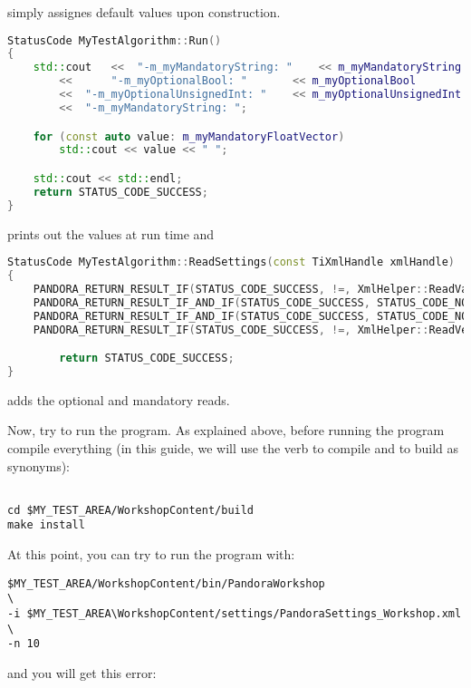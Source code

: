 simply assignes default values upon construction.

\begin{lstlisting}[language=C++, caption=Python example]
StatusCode MyTestAlgorithm::Run()
{
    std::cout	<<	"-m_myMandatoryString: " 	<< m_myMandatoryString 		<< std::endl
		<<      "-m_myOptionalBool: "	 	<< m_myOptionalBool    		<< std::endl
		<<	"-m_myOptionalUnsignedInt: "	<< m_myOptionalUnsignedInt	<< std::endl
		<<	"-m_myMandatoryString: ";	

    for (const auto value: m_myMandatoryFloatVector)
        std::cout << value << " ";    

    std::cout << std::endl;
    return STATUS_CODE_SUCCESS;
}
\end{lstlisting}

prints out the values at run time and

\begin{lstlisting}[language=C++, caption=Python example]
StatusCode MyTestAlgorithm::ReadSettings(const TiXmlHandle xmlHandle)
{
	PANDORA_RETURN_RESULT_IF(STATUS_CODE_SUCCESS, !=, XmlHelper::ReadValue(xmlHandle,"MyMandatoryString", m_myMandatoryString));
	PANDORA_RETURN_RESULT_IF_AND_IF(STATUS_CODE_SUCCESS, STATUS_CODE_NOT_FOUND, !=, XmlHelper::ReadValue(xmlHandle,"MyOptionalBool", m_myOptionalBool));
	PANDORA_RETURN_RESULT_IF_AND_IF(STATUS_CODE_SUCCESS, STATUS_CODE_NOT_FOUND, !=, XmlHelper::ReadValue(xmlHandle,"MyOptionalUnsignedInt", m_myOptionalUnsignedInt));
	PANDORA_RETURN_RESULT_IF(STATUS_CODE_SUCCESS, !=, XmlHelper::ReadVectorOfValues(xmlHandle,"MyMandatoryFloatVector", m_myMandatoryFloatVector));

        return STATUS_CODE_SUCCESS;
}
\end{lstlisting}
adds the optional and mandatory reads.

Now, try to run the program. As explained above, before running the program compile everything (in this guide, we will use the verb to compile and to build as synonyms):


\begin{verbatim}

cd $MY_TEST_AREA/WorkshopContent/build
make install

\end{verbatim}



At this point, you can try to run the program with:
\begin{numVblock}\label{code:launch}
\begin{verbatim}
$MY_TEST_AREA/WorkshopContent/bin/PandoraWorkshop                      \
-i $MY_TEST_AREA\WorkshopContent/settings/PandoraSettings_Workshop.xml \
-n 10
\end{verbatim}
\end{numVblock}
and you will get this error:

